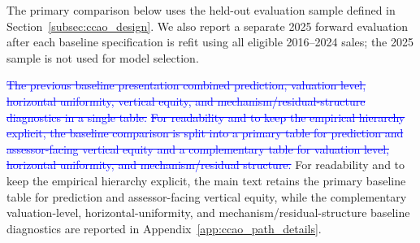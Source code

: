 \documentclass[10pt]{article}
\theoremstyle{definition}
\newcommand{\1}{\mathbf{1}}
\newcommand{\oldtext}[1]{\textcolor{blue}{\sout{#1}}}
\newcommand{\latesttext}[1]{\textcolor{latestPurple}{#1}}
\begin{document}
{The primary comparison below uses the held-out evaluation sample defined in Section~\ref{subsec:ccao_design}. We also report a separate 2025 forward evaluation after each baseline specification is refit using all eligible 2016--2024 sales; the 2025 sample is not used for model selection.}


\oldtext{The previous baseline presentation combined prediction, valuation level, horizontal uniformity, vertical equity, and mechanism/residual-structure diagnostics in a single table.}
\oldtext{For readability and to keep the empirical hierarchy explicit, the baseline comparison is split into a primary table for prediction and assessor-facing vertical equity and a complementary table for valuation level, horizontal uniformity, and mechanism/residual structure.}
\latesttext{For readability and to keep the empirical hierarchy explicit, the main text retains the primary baseline table for prediction and assessor-facing vertical equity, while the complementary valuation-level, horizontal-uniformity, and mechanism/residual-structure baseline diagnostics are reported in Appendix~\ref{app:ccao_path_details}.}
\end{document}
